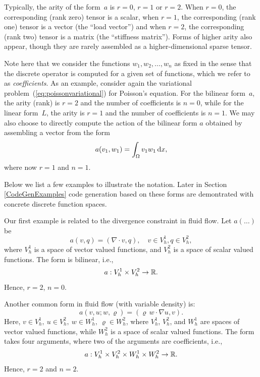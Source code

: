 Typically, the arity of the form~$a$ is $r = 0$, $r = 1$
or $r = 2$. When $r = 0$, the corresponding (rank zero) tensor is a
scalar, when $r = 1$, the corresponding (rank one) tensor is a vector
(the ``load vector'') and when $r = 2$, the corresponding (rank two)
tensor is a matrix (the ``stiffness matrix'').
Forms of higher arity also appear, though they are rarely assembled as
a higher-dimensional sparse tensor.

Note here that we consider the functions $w_1, w_2, \ldots, w_n$ as
fixed in the sense that the discrete operator is computed for a given
set of functions, which we refer to as \emph{coefficients}. As an
example, consider again the variational
problem~(\ref{eq:poissonvariational}) for Poisson's equation. For the
bilinear form~$a$, the arity (rank) is $r = 2$ and the number of
coefficients is $n = 0$, while for the linear form~$L$, the arity is
$r = 1$ and the number of coefficients is $n = 1$. We may also choose
to directly compute the action of the bilinear form $a$ obtained by
assembling a vector from the form
\begin{equation}
  a(v_1, w_1) = \int_{\Omega} v_1 w_1 \, \mathrm{d}x,
\end{equation}
where now $r = 1$ and $n = 1$.

Below we list a few examples to illustrate the notation. 
Later in Section \ref{CodeGenExamples} code generation based
on these forms are demontrated with concrete discrete function
spaces. 

\begin{example}
\label{example:div}
Our first example is related
to the divergence constraint in fluid flow. Let $a(\ldots)$ be    
\begin{equation}
a(v,q) = (\nabla \cdot v, q), \quad v\in V_h^1, q \in V_h^2, 
\end{equation}
where $V_h^1$ is a space of vector valued functions, 
and $V_h^2$ is a space of scalar valued functions. 
The form is bilinear, i.e.,  
\begin{equation}
a : V_h^1 \times V_h^2  \rightarrow \mathbb{R}.
\end{equation}
Hence, $r=2$, $n=0$.   
\end{example}

\begin{example}
\label{example:nonlinearconv}
Another common form in fluid flow (with variable density) is: 
\begin{equation}
a(v,u;w,\varrho) = ( \varrho \, w \cdot \nabla  u, v). 
\end{equation}
Here, $v\in V_h^1,\ u \in V_h^2,\ w\in W_h^1, \ \varrho \in W_h^2$, where
$V_h^1$, $V_h^2$, and $W_h^1$ are spaces of vector valued functions, while $W_h^2$ is a space of  
scalar valued functions. 
The form takes four arguments, where two of the arguments
are coefficients, i.e.,
\begin{equation}
a : V_h^1 \times V_h^2 \times W_h^1 \times W_h^2 \rightarrow \mathbb{R}.
\end{equation}
Hence, $r=2$ and $n=2$. 
\end{example}


